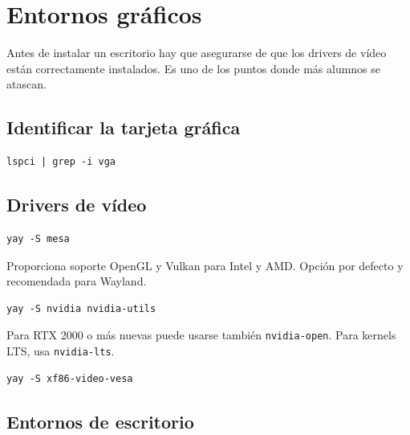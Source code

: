 \section{Entornos gráficos}

Antes de instalar un escritorio hay que asegurarse de que los drivers de vídeo
están correctamente instalados. Es uno de los puntos donde más alumnos se atascan.

\subsection{Identificar la tarjeta gráfica}

\begin{tcolorbox}[title=Identificamos el hardware gráfico]
\begin{lstlisting}[style=bashstyle]
lspci | grep -i vga
\end{lstlisting}
\end{tcolorbox}

\subsection{Drivers de vídeo}

\begin{tcolorbox}[title=Intel o AMD — Mesa (recomendado)]
\begin{lstlisting}[style=bashstyle]
yay -S mesa
\end{lstlisting}
\tcblower
\scriptsize Proporciona soporte OpenGL y Vulkan para Intel y AMD. Opción por defecto y recomendada para Wayland.
\end{tcolorbox}

\begin{tcolorbox}[title=NVIDIA — driver propietario]
\begin{lstlisting}[style=bashstyle]
yay -S nvidia nvidia-utils
\end{lstlisting}
\tcblower
\scriptsize Para RTX 2000 o más nuevas puede usarse también \texttt{nvidia-open}. Para kernels LTS, usa \texttt{nvidia-lts}.
\end{tcolorbox}

\begin{tcolorbox}[title=Hardware antiguo o genérico]
\begin{lstlisting}[style=bashstyle]
yay -S xf86-video-vesa
\end{lstlisting}
\end{tcolorbox}

\subsection{Entornos de escritorio}


